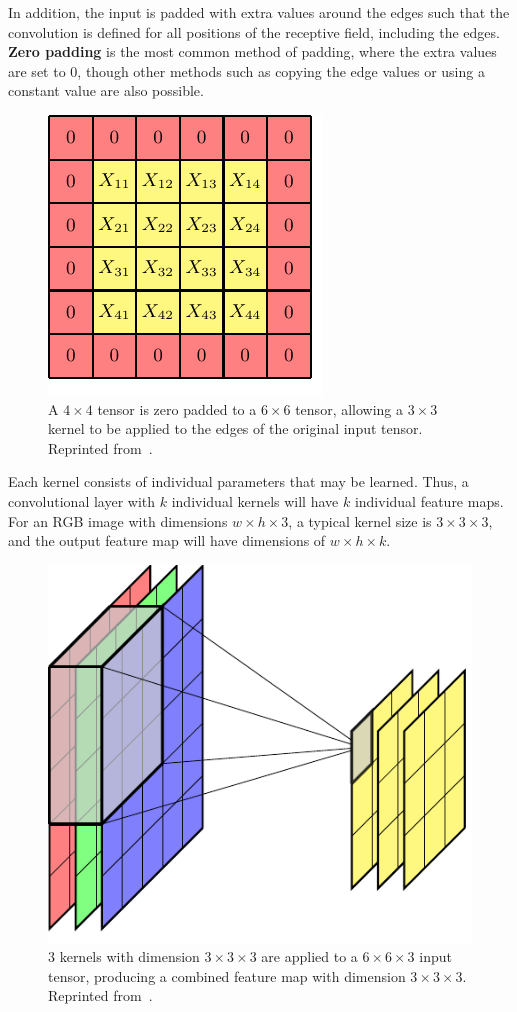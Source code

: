 \documentclass[12pt]{report}
\theoremstyle{definition}
\theoremstyle{remark}
\begin{document}
In addition, the input is padded with extra values around the edges such that the convolution is defined for all positions of the receptive field, including the edges. \textbf{Zero padding} is the most common method of padding, where the extra values are set to $0$, though other methods such as copying the edge values or using a constant value are also possible.

\begin{figure}
    \centering
    \includegraphics[width=0.35\linewidth]{figs/padding.pdf}
    \caption{A $4 \times 4$ tensor is zero padded to a $6 \times 6$ tensor, allowing a $3 \times 3$ kernel to be applied to the edges of the original input tensor. Reprinted from~\cite{bishop_deep_2023}.}
    \label{fig:padding}
\end{figure}

Each kernel consists of individual parameters that may be learned. Thus, a convolutional layer with $k$ individual kernels will have $k$ individual feature maps. For an RGB image with dimensions $w \times h \times 3$, a typical kernel size is $3 \times 3 \times 3$, and the output feature map will have dimensions of $w \times h \times k$.

\begin{figure}
    \centering
    \includegraphics[width=0.5\linewidth]{figs/multiple_kernels.pdf}
    \caption{$3$ kernels with dimension $3 \times 3 \times 3$ are applied to a $6 \times 6 \times 3$ input tensor, producing a combined feature map with dimension $3 \times 3 \times 3$. Reprinted from~\cite{bishop_deep_2023}.}
    \label{fig:multiple-kernels}
\end{figure}
\end{document}
